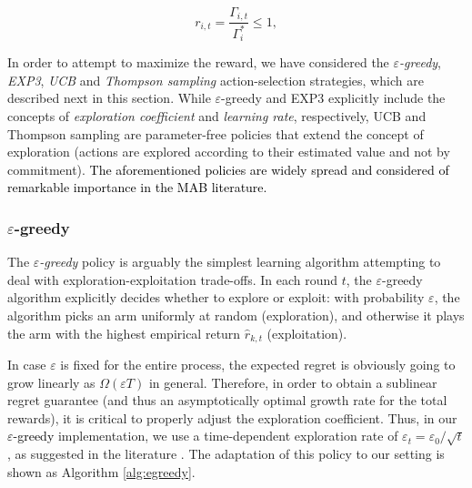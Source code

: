 \documentclass{article}
\begin{document}
	\begin{equation}
	r_{i,t} = {\frac{\Gamma_{i,t}}{{\Gamma_{i}^*}}} \leq 1,
	\label{eq:reward_generation}
	\nonumber
	\end{equation}
	
	In order to attempt to maximize the reward, we have considered the \emph{$\varepsilon$-greedy}, \emph{EXP3}, \emph{UCB} and \emph{Thompson sampling} action-selection strategies, which are described next in this section. While $\varepsilon$-greedy and EXP3 explicitly include the concepts of \emph{exploration coefficient} and \emph{learning rate}, respectively, UCB and Thompson sampling are parameter-free policies that extend the concept of exploration (actions are explored according to their estimated value and not by commitment). \textcolor{black}{The aforementioned policies are widely spread and considered of remarkable importance in the MAB literature.} 
	
	\subsubsection{$\varepsilon$-greedy}
	\label{section:bandits_egreedy}	
	The \emph{$\varepsilon$-greedy} policy \cite{sutton1998reinforcement,auer2002finite} is arguably the simplest learning algorithm attempting to deal with exploration-exploitation trade-offs. In each round $t$, the $\varepsilon$-greedy algorithm explicitly decides whether to explore or exploit: with probability $\varepsilon$, the algorithm picks an arm uniformly at random (exploration), and otherwise it plays the arm with the highest empirical return $\hat{r}_{k,t}$ (exploitation). 
	
	In case $\varepsilon$ is fixed for the entire process, the expected regret is obviously going to grow linearly as $\Omega\left(\varepsilon T\right)$ in general. Therefore, in order to obtain a sublinear regret guarantee (and thus an asymptotically optimal growth rate for the total rewards), it is critical to properly adjust the exploration coefficient. Thus, in our \textcolor{black}{$\varepsilon$-greedy} implementation, we use a time-dependent exploration rate of $\varepsilon_t = \varepsilon_0 / \sqrt{t}$, as suggested in the literature \cite{auer2002finite}. The adaptation of this policy to our setting is shown as Algorithm \ref{alg:egreedy}.
	
\end{document}
